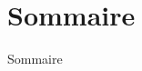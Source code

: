 \documentclass[12pt]{beamer}
\begin{document}
	\begin{frame}
	    \titlepage
	\end{frame}
	
	\section*{Sommaire}
	\begin{frame}{Sommaire}
	    \tableofcontents
	\end{frame}
	
	
	
	
\end{document}
